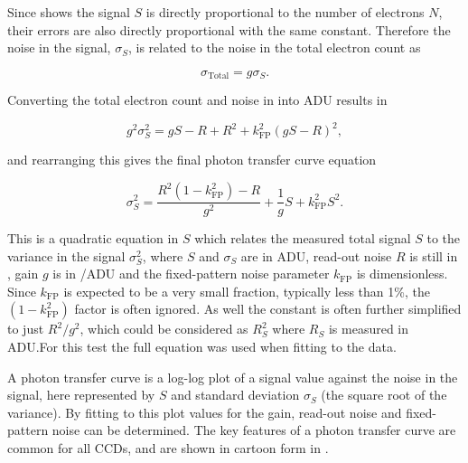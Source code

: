 \begin{colsection}
\begin{colsection}
Since  shows the signal $S$ is directly proportional to the number of electrons $N$, their errors are also directly proportional with the same constant. Therefore the noise in the signal, $\sigma_S$, is related to the noise in the total electron count as

\begin{equation}
    \sigma_\text{Total} = g \sigma_S.
    \label{eq:noise_gain}
\end{equation}

Converting the total electron count and noise in  into ADU results in

\begin{equation}
    g^2\sigma_S^2 = gS - R + R^2 + k_\text{FP}^2 {(gS - R)}^2,
    \label{eq:ptc_noise2}
\end{equation}

and rearranging this gives the final photon transfer curve equation

\begin{equation}
    \sigma_S^2 = \frac{R^2(1-k_\text{FP}^2) - R}{g^2} + \frac{1}{g}S + k_\text{FP}^2 S^2.
    \label{eq:ptc}
\end{equation}

This is a quadratic equation in $S$ which relates the measured total signal $S$ to the variance in the signal $\sigma_S^2$, where $S$ and $\sigma_S$ are in ADU, read-out noise $R$ is still in \elec, gain $g$ is in \elec/ADU and the fixed-pattern noise parameter $k_\text{FP}$ is dimensionless. Since $k_\text{FP}$ is expected to be a very small fraction, typically less than 1\%, the $(1-k_\text{FP}^2)$ factor is often ignored. As well the constant is often further simplified to just $R^2/g^2$, which could be considered as $R_S^2$ where $R_S$ is measured in ADU.\@ For this test the full equation was used when fitting to the data.

A photon transfer curve is a log-log plot of a signal value against the noise in the signal, here represented by $S$ and standard deviation $\sigma_S$ (the square root of the variance). By fitting  to this plot values for the gain, read-out noise and fixed-pattern noise can be determined. The key features of a photon transfer curve are common for all CCDs, and are shown in cartoon form in .


\end{colsection}
\end{colsection}
